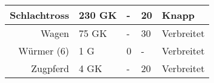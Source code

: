 \documentclass[a4paper, 9pt]{scrartcl}
\begin{document}
\begin{table}[ht!]
\begin{minipage}{.5\linewidth}
\begin{tabularx}{0.95\linewidth}{Rllll}
            Schlachtross            & 230 GK         & -           & 20            & Knapp          \\ \hline
            Wagen                   & 75 GK          & -           & 30            & Verbreitet     \\ \hline
            Würmer (6)              & 1 G            & 0           & -             & Verbreitet     \\ \hline
            Zugpferd                & 4 GK           & -           & 20            & Verbreitet
        \end{tabularx}%

    \end{minipage}
\end{table}

\clearpage

\begin{table}[]
    \begin{minipage}{.5\linewidth}
        \centering


\end{minipage}
\end{table}
\end{document}
